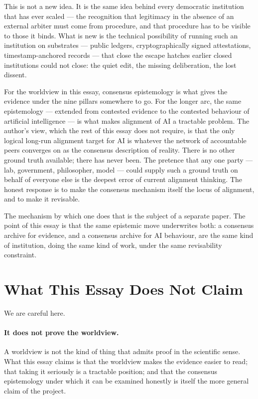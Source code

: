 \documentclass[11pt,a4paper]{article}
\begin{document}
This is not a new idea. It is the same idea behind every
democratic institution that has ever scaled --- the recognition
that legitimacy in the absence of an external arbiter must come
from procedure, and that procedure has to be visible to those it
binds. What is new is the technical possibility of running such an
institution on substrates --- public ledgers, cryptographically
signed attestations, timestamp-anchored records --- that close the
escape hatches earlier closed institutions could not close: the
quiet edit, the missing deliberation, the lost dissent.

For the worldview in this essay, consensus epistemology is what
gives the evidence under the nine pillars somewhere to go. For
the longer arc, the same epistemology --- extended from contested
evidence to the contested behaviour of artificial intelligence ---
is what makes alignment of AI a tractable problem. The author's
view, which the rest of this essay does not require, is that the
only logical long-run alignment target for AI is whatever the
network of accountable peers converges on as the consensus
description of reality. There is no other ground truth available;
there has never been. The pretence that any one party --- lab,
government, philosopher, model --- could supply such a ground
truth on behalf of everyone else is the deepest error of current
alignment thinking. The honest response is to make the consensus
mechanism itself the locus of alignment, and to make it
revisable.

The mechanism by which one does that is the subject of a separate
paper. The point of this essay is that the same epistemic move
underwrites both: a consensus archive for evidence, and a
consensus archive for AI behaviour, are the same kind of
institution, doing the same kind of work, under the same
revisability constraint.

\section{What This Essay Does Not Claim}

We are careful here.

\paragraph{It does not prove the worldview.} A worldview is not
the kind of thing that admits proof in the scientific sense. What
this essay claims is that the worldview makes the evidence easier
to read; that taking it seriously is a tractable position; and
that the consensus epistemology under which it can be examined
honestly is itself the more general claim of the project.
\end{document}

